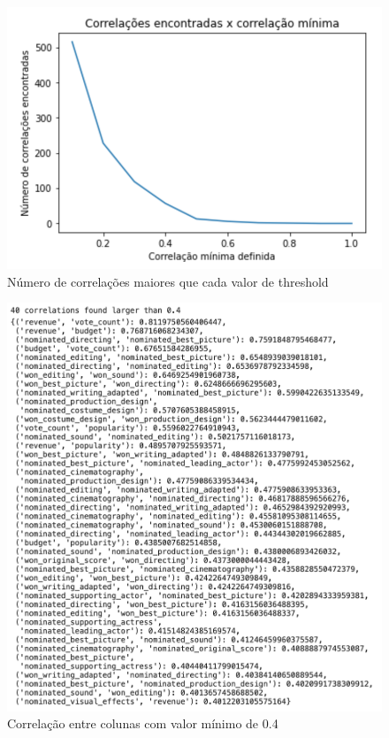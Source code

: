             \begin{figure}[htb]
            	\caption{\label{corrs_graph}Número de correlações maiores que cada valor de threshold}
            	\begin{center}
            		\includegraphics[scale=0.8]{corrs_graph.png}
            	\end{center}
            \end{figure}

            \begin{figure}[htb]
            	\caption{\label{corrs0.4}Correlação entre colunas com valor mínimo de 0.4}
            	\begin{center}
            		\includegraphics[scale=0.7]{corrs0.4.png}
            	\end{center}
            \end{figure}

